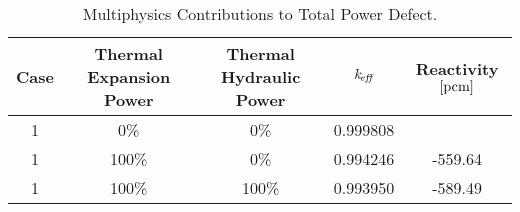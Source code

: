   \begin{table}
    \caption{Multiphysics Contributions to Total Power Defect.}
    \label{tab:multiphysics_worths}
    \centering
    \begin{tabular}{ccccc}
      \toprule
      Case & Thermal Expansion Power & Thermal Hydraulic Power & $k_{\!\mbox{\scriptsize \em eff}}$ & 
        Reactivity $\left[\text{{pcm}}\right]$ \\
      \midrule
      1 & 0\%   & 0\%   & 0.999808 & \\
      1 & 100\% & 0\%   & 0.994246 & -559.64 \\
      1 & 100\% & 100\% & 0.993950 & -589.49 \\
      \bottomrule
    \end{tabular}
  \end{table}
